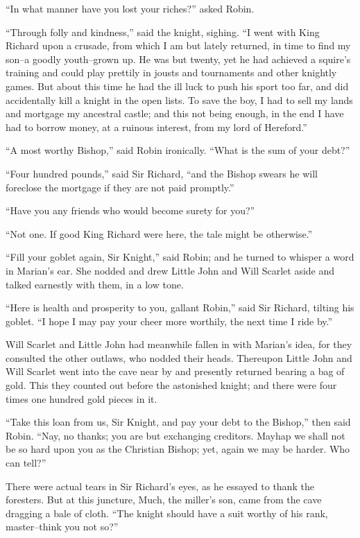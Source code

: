 ``In what manner have you lost your riches?'' asked Robin.

``Through folly and kindness,'' said the knight, sighing. ``I went with
King Richard upon a crusade, from which I am but lately returned, in
time to find my son--a goodly youth--grown up. He was but twenty, yet he
had achieved a squire's training and could play prettily in jousts and
tournaments and other knightly games. But about this time he had the ill
luck to push his sport too far, and did accidentally kill a knight in
the open lists. To save the boy, I had to sell my lands and mortgage my
ancestral castle; and this not being enough, in the end I have had to
borrow money, at a ruinous interest, from my lord of Hereford.''

``A most worthy Bishop,'' said Robin ironically. ``What is the sum of
your debt?''

``Four hundred pounds,'' said Sir Richard, ``and the Bishop swears he
will foreclose the mortgage if they are not paid promptly.''

``Have you any friends who would become surety for you?''

``Not one. If good King Richard were here, the tale might be
otherwise.''

``Fill your goblet again, Sir Knight,'' said Robin; and he turned to
whisper a word in Marian's ear. She nodded and drew Little John and Will
Scarlet aside and talked earnestly with them, in a low tone.

``Here is health and prosperity to you, gallant Robin,'' said Sir
Richard, tilting his goblet. ``I hope I may pay your cheer more
worthily, the next time I ride by.''

Will Scarlet and Little John had meanwhile fallen in with Marian's idea,
for they consulted the other outlaws, who nodded their heads. Thereupon
Little John and Will Scarlet went into the cave near by and presently
returned bearing a bag of gold. This they counted out before the
astonished knight; and there were four times one hundred gold pieces in
it.

``Take this loan from us, Sir Knight, and pay your debt to the Bishop,''
then said Robin. ``Nay, no thanks; you are but exchanging creditors.
Mayhap we shall not be so hard upon you as the Christian Bishop; yet,
again we may be harder. Who can tell?''

There were actual tears in Sir Richard's eyes, as he essayed to thank
the foresters. But at this juncture, Much, the miller's son, came from
the cave dragging a bale of cloth. ``The knight should have a suit
worthy of his rank, master--think you not so?''

